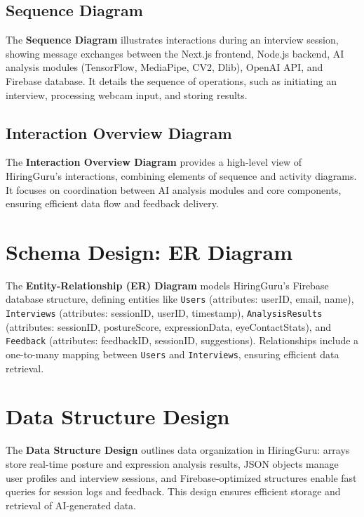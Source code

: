 \subsection{Sequence Diagram}
The \textbf{Sequence Diagram} illustrates interactions during an interview session, showing message exchanges between the Next.js frontend, Node.js backend, AI analysis modules (TensorFlow, MediaPipe, CV2, Dlib), OpenAI API, and Firebase database. It details the sequence of operations, such as initiating an interview, processing webcam input, and storing results.

\subsection{Interaction Overview Diagram}
The \textbf{Interaction Overview Diagram} provides a high-level view of HiringGuru’s interactions, combining elements of sequence and activity diagrams. It focuses on coordination between AI analysis modules and core components, ensuring efficient data flow and feedback delivery.

\section{Schema Design: ER Diagram}
The \textbf{Entity-Relationship (ER) Diagram} models HiringGuru’s Firebase database structure, defining entities like \texttt{Users} (attributes: userID, email, name), \texttt{Interviews} (attributes: sessionID, userID, timestamp), \texttt{AnalysisResults} (attributes: sessionID, postureScore, expressionData, eyeContactStats), and \texttt{Feedback} (attributes: feedbackID, sessionID, suggestions). Relationships include a one-to-many mapping between \texttt{Users} and \texttt{Interviews}, ensuring efficient data retrieval.

\section{Data Structure Design}
The \textbf{Data Structure Design} outlines data organization in HiringGuru: arrays store real-time posture and expression analysis results, JSON objects manage user profiles and interview sessions, and Firebase-optimized structures enable fast queries for session logs and feedback. This design ensures efficient storage and retrieval of AI-generated data.


